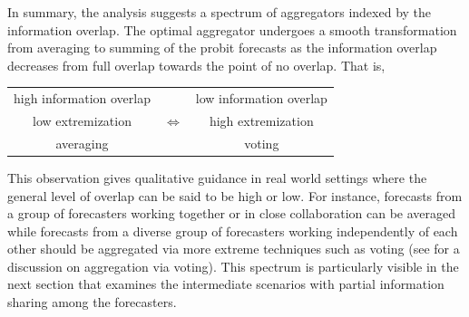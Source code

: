 \documentclass[11pt]{article}
\newtheorem{observation}[theorem]{Observation}
\newtheorem{proposition}[theorem]{Proposition}
\theoremstyle{definition}
\theoremstyle{definition}
\begin{document}
In summary, the analysis suggests a spectrum of aggregators indexed by
the information overlap.  The optimal aggregator undergoes a smooth
transformation from averaging to summing of the probit forecasts as
the information overlap decreases from full overlap towards the point
of no overlap.
That is,
\begin{center}
\begin{tabular}{ccc}
high information overlap & & low information overlap\\
low extremization & {\Large $\Longleftrightarrow$} & high extremization \\
averaging  & & voting\\
\end{tabular}
\end{center}
This observation gives qualitative guidance in real world settings
where the general level of overlap can be said to be high or low.  For
instance, forecasts from a group of forecasters working together or in
close collaboration can be averaged while forecasts from a diverse
group of forecasters working independently of each other should be
aggregated via more extreme techniques such as voting (see
\citealt{parunak2013characterizing} for a discussion on aggregation
via voting). This spectrum is particularly visible in the next section
that examines the intermediate scenarios with partial information
sharing among the forecasters.

%
\end{document}
